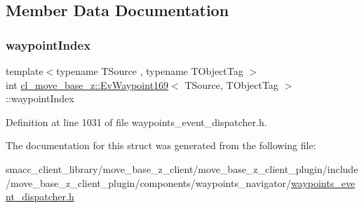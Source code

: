 \subsection{Member Data Documentation}
\mbox{\label{structcl__move__base__z_1_1EvWaypoint169_a4fdb3343d1e9a763ee1181ecd47b25f7}} 
\subsubsection{\texorpdfstring{waypoint\+Index}{waypointIndex}}
{\footnotesize\ttfamily template$<$typename T\+Source , typename T\+Object\+Tag $>$ \\
int \hyperlink{structcl__move__base__z_1_1EvWaypoint169}{cl\+\_\+move\+\_\+base\+\_\+z\+::\+Ev\+Waypoint169}$<$ T\+Source, T\+Object\+Tag $>$\+::waypoint\+Index}



Definition at line 1031 of file waypoints\+\_\+event\+\_\+dispatcher.\+h.



The documentation for this struct was generated from the following file\+:\begin{DoxyCompactItemize}
\item 
smacc\+\_\+client\+\_\+library/move\+\_\+base\+\_\+z\+\_\+client/move\+\_\+base\+\_\+z\+\_\+client\+\_\+plugin/include/move\+\_\+base\+\_\+z\+\_\+client\+\_\+plugin/components/waypoints\+\_\+navigator/\hyperlink{waypoints__event__dispatcher_8h}{waypoints\+\_\+event\+\_\+dispatcher.\+h}\end{DoxyCompactItemize}
